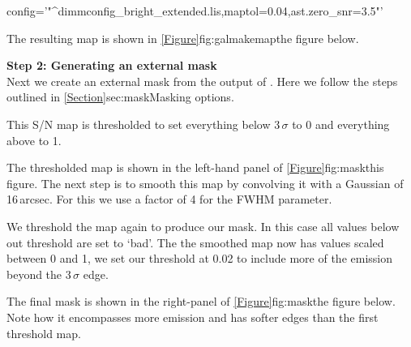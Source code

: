 \documentclass[11pt,oneside,chapters]{starlink}
\begin{document}
\begin{terminalv}
config='"^dimmconfig_bright_extended.lis,maptol=0.04,ast.zero_snr=3.5"'
\end{terminalv}
The resulting map is shown in \cref{Figure}{fig:galmakemap}{the figure below}.


\textbf{Step 2: Generating an external mask}
\vspace{0.2cm}\\
Next we create an external mask from the output of \makemap. Here we
follow the steps outlined in \cref{Section}{sec:mask}{Masking options}.

\begin{terminalv}
\end{terminalv}

This S/N map is thresholded to set everything below 3\,$\sigma$ to 0 and
everything above to 1.

\begin{terminalv}
\end{terminalv}
The thresholded map is shown in the left-hand panel of
\cref{Figure}{fig:mask}{this figure}. The next step is to smooth this map
by convolving it with a Gaussian of 16\,arcsec. For this we use a factor
of 4 for the FWHM parameter.

\begin{terminalv}
\end{terminalv}

We threshold the map again to produce our mask. In this case all
values below out threshold are set to `bad'. The the smoothed map now
has values scaled between 0 and 1, we set our threshold at 0.02 to
include more of the emission beyond the 3\,$\sigma$ edge.
\begin{terminalv}
\end{terminalv}
The final mask is shown in the right-panel of \cref{Figure}{fig:mask}{the figure below}.
Note how it encompasses more emission and has softer edges than the
first threshold map. \\
\end{document}
